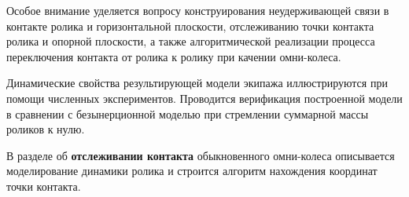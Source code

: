 Особое внимание уделяется вопросу конструирования неудерживающей связи в контакте ролика и горизонтальной плоскости,
отслеживанию точки контакта ролика и опорной плоскости,
а также алгоритмической реализации процесса 
переключения контакта от ролика к ролику при качении омни-колеса.

Динамические свойства результирующей модели экипажа иллюстрируются при помощи численных экспериментов.
Проводится верификация построенной модели в сравнении с безынерционной моделью при стремлении суммарной массы роликов к нулю.

В разделе об \textbf{отслеживании контакта} обыкновенного омни-колеса описывается моделирование динамики ролика и строится алгоритм нахождения координат точки контакта.

%
%

